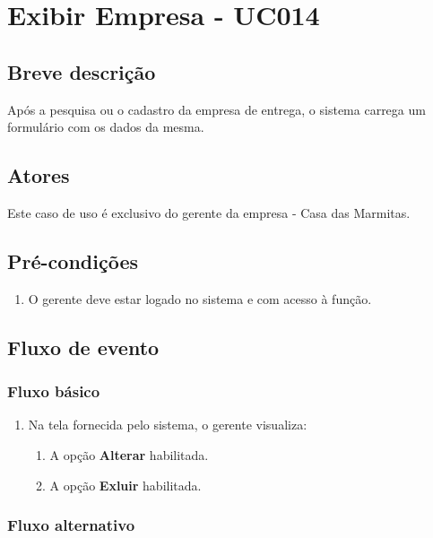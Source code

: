 \chapter{Exibir Empresa - UC014} \label{uc014}

\section{Breve descrição}

Após a pesquisa ou o cadastro da empresa de entrega, o sistema carrega um formulário com os dados da mesma.

\section{Atores}

Este caso de uso é exclusivo do gerente da empresa - Casa das Marmitas.

\section{Pré-condições}

\begin{enumerate}
	\item O gerente deve estar logado no sistema e com acesso à função.
\end{enumerate}

\section{Fluxo de evento}

\subsection{Fluxo básico}

\begin{enumerate}
	\item Na tela fornecida pelo sistema, o gerente visualiza:
	\begin{enumerate}
		\item A opção \textbf{Alterar} habilitada.
		\item A opção \textbf{Exluir} habilitada.
	\end{enumerate}		
\end{enumerate}

\subsection{Fluxo alternativo}

